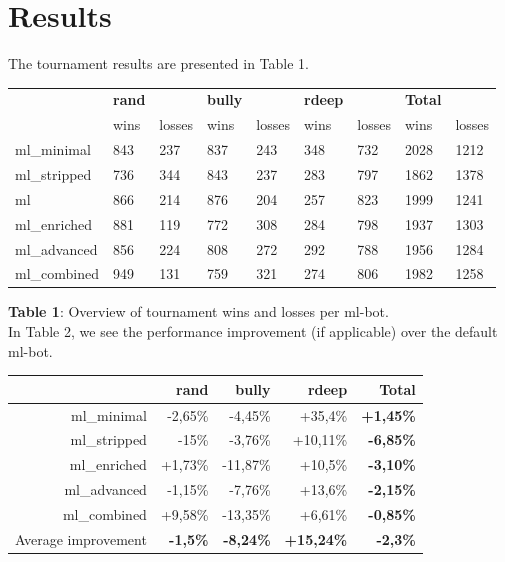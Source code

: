 \documentclass[a4paper,11pt]{article}
\begin{document}
\section{Results}
The tournament results are presented in Table 1. 

\setlength{\leftmargin}{0pt}
\begin{center}
  \begin{tabular}{ | l | l l | l l | l l | |l l | }
     \hline
      & \textbf{rand} & & \textbf{bully} & & \textbf{rdeep} & & \textbf{Total} & \\
      & wins & losses & wins & losses & wins & losses  & wins & losses \\ \hline
      ml\_minimal & 843 & 237 & 837 & 243 & 348 & 732 & 2028 & 1212 \\ \hline
      ml\_stripped & 736 & 344 & 843 & 237 & 283 & 797 & 1862 & 1378 \\ \hline
      ml & 866 & 214 & 876 & 204 & 257 & 823 & 1999 & 1241 \\ \hline 
      ml\_enriched & 881 & 119 & 772 & 308 & 284 & 798 & 1937 & 1303 \\ \hline
      ml\_advanced  & 856 & 224 & 808 & 272 & 292 & 788 & 1956 & 1284 \\ \hline
      ml\_combined & 949 & 131 & 759 & 321 & 274 & 806  & 1982 & 1258\\ \hline
  \end{tabular}
\end{center}
\textbf{Table 1}: Overview of tournament wins and losses per ml-bot. \\

In Table 2, we see the performance improvement (if applicable) over the default ml-bot.
\begin{center}
\begin{tabular}{| r | r | r | r || r |}
\hline
      & \textbf{rand} & \textbf{bully} & \textbf{rdeep} & \textbf{Total} \\ \hline
      ml\_minimal & -2,65\% & -4,45\% & +35,4\% & \textbf{+1,45\%}   \\ \hline
      ml\_stripped & -15\% & -3,76\% & +10,11\% & \textbf{-6,85\%}  \\ \hline
      ml\_enriched & +1,73\% & -11,87\% & +10,5\% & \textbf{-3,10\%} \\ \hline
      ml\_advanced & -1,15\% & -7,76\% & +13,6\%& \textbf{-2,15\%}  \\ \hline
      ml\_combined & +9,58\% & -13,35\% & +6,61\% & \textbf{-0,85\%}  \\ \hline \hline
      Average improvement & \textbf{-1,5\%} & \textbf{-8,24\%} & \textbf{+15,24\%} &\textbf{-2,3\%} \\ \hline
\end{tabular} \\
\end{center}
\end{document}
